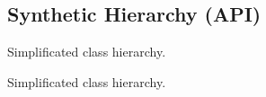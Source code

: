 \hypertarget{group__grpSynthHierarchy}{\subsection{Synthetic Hierarchy (A\-P\-I)}
\label{group__grpSynthHierarchy}
}


Simplificated class hierarchy.  


Simplificated class hierarchy.  